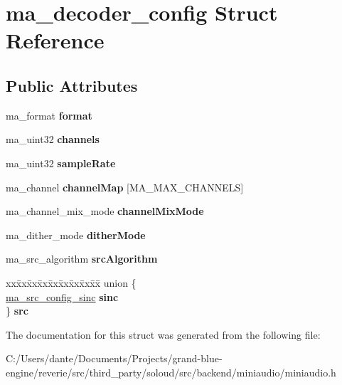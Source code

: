 \hypertarget{structma__decoder__config}{}\section{ma\+\_\+decoder\+\_\+config Struct Reference}
\label{structma__decoder__config}
\subsection*{Public Attributes}
\begin{DoxyCompactItemize}
\item 
\mbox{\label{structma__decoder__config_a5b9d8c9374bb5f7661c7d4878e6ff192}} 
ma\+\_\+format {\bfseries format}
\item 
\mbox{\label{structma__decoder__config_a9ff07f790090caaeceb066ec1e77d4cb}} 
ma\+\_\+uint32 {\bfseries channels}
\item 
\mbox{\label{structma__decoder__config_af215da67a8a26346fc9c51354fed8e53}} 
ma\+\_\+uint32 {\bfseries sample\+Rate}
\item 
\mbox{\label{structma__decoder__config_a4b934481433b919b54a28cdb7ff78721}} 
ma\+\_\+channel {\bfseries channel\+Map} \mbox{[}M\+A\+\_\+\+M\+A\+X\+\_\+\+C\+H\+A\+N\+N\+E\+LS\mbox{]}
\item 
\mbox{\label{structma__decoder__config_a54f88cd33c9ae9e1a7e93f5e2b3b9a22}} 
ma\+\_\+channel\+\_\+mix\+\_\+mode {\bfseries channel\+Mix\+Mode}
\item 
\mbox{\label{structma__decoder__config_a296bb4d5be94e04bf0ee738aa625487b}} 
ma\+\_\+dither\+\_\+mode {\bfseries dither\+Mode}
\item 
\mbox{\label{structma__decoder__config_aaec6a549a369150a311b8fb0d7eb7e00}} 
ma\+\_\+src\+\_\+algorithm {\bfseries src\+Algorithm}
\item 
\mbox{\label{structma__decoder__config_a0fa92b29d906b2f167601baffb600001}} 
\begin{tabbing}
xx\=xx\=xx\=xx\=xx\=xx\=xx\=xx\=xx\=\kill
union \{\\
\>\mbox{\hyperlink{structma__src__config__sinc}{ma\_src\_config\_sinc}} {\bfseries sinc}\\
\} {\bfseries src}\\

\end{tabbing}\end{DoxyCompactItemize}


The documentation for this struct was generated from the following file\+:\begin{DoxyCompactItemize}
\item 
C\+:/\+Users/dante/\+Documents/\+Projects/grand-\/blue-\/engine/reverie/src/third\+\_\+party/soloud/src/backend/miniaudio/miniaudio.\+h\end{DoxyCompactItemize}
